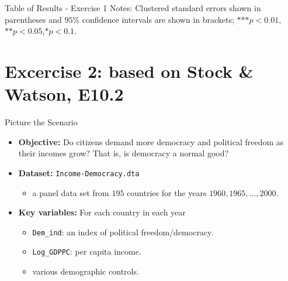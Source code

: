 \documentclass[
  10pt,
  ignorenonframetext,
]{beamer}
\providecommand{\tightlist}{%
  \setlength{\itemsep}{0pt}\setlength{\parskip}{0pt}}
\begin{document}
\begin{frame}{Table of Results - Exercise 1}
Notes: Clustered standard errors shown in parentheses and \(95\%\)
confidence intervals are shown in brackets;
\(\text{***} p<0.01\),\(\text{**} p<0.05\),\(\text{*} p<0.1\).
\end{frame}

\hypertarget{excercise-2-based-on-stock-watson-e10.2}{%
\section{Excercise 2: based on Stock \& Watson,
E10.2}\label{excercise-2-based-on-stock-watson-e10.2}}

\begin{frame}[fragile]{Picture the Scenario}
\protect\hypertarget{picture-the-scenario}{}
\begin{itemize}
\tightlist
\item
  \textbf{Objective:} Do citizens demand more democracy and political
  freedom as their incomes grow? That is, is democracy a normal good?
\end{itemize}

\vspace{0.8mm}

\begin{itemize}
\tightlist
\item
  \textbf{Dataset:} \texttt{Income-Democracy.dta}

  \begin{itemize}
  \tightlist
  \item
    a panel data set from \(195\) countries for the years
    \(1960, 1965,\ldots,2000\).
  \end{itemize}
\end{itemize}

\vspace{0.8mm}

\begin{itemize}
\tightlist
\item
  \textbf{Key variables:} For each country in each year

  \begin{itemize}
  \tightlist
  \item
    \texttt{Dem\_ind}: an index of political freedom/democracy.
  \item
    \texttt{Log\_GDPPC}: per capita income.
  \item
    various demographic controls.
  \end{itemize}
\end{itemize}
\end{frame}
\end{document}
